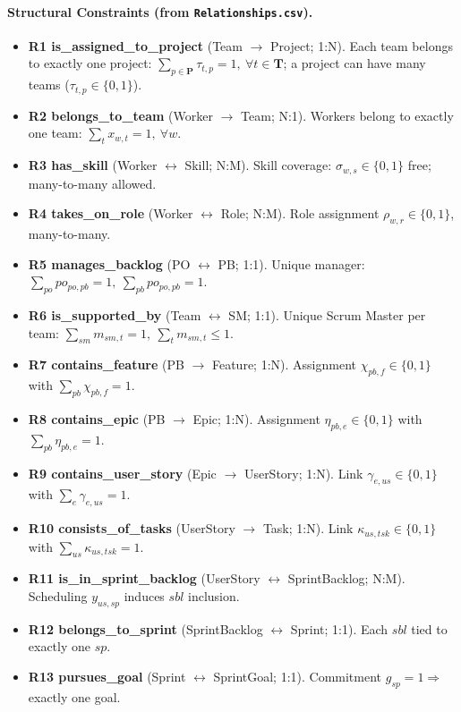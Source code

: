 \documentclass[11pt,a4paper]{article}
\begin{document}
\paragraph{Structural Constraints (from \texttt{Relationships.csv}).}
\begin{itemize}[leftmargin=2em,itemsep=0.6em]
  \item \textbf{R1 is\_assigned\_to\_project} (Team $\to$ Project; 1:N). Each team belongs to exactly one project: 
  $\sum_{p \in \mathbf{P}} \tau_{t,p}=1,\ \forall t\in\mathbf{T}$; a project can have many teams ($\tau_{t,p}\in\{0,1\}$).
  \item \textbf{R2 belongs\_to\_team} (Worker $\to$ Team; N:1). Workers belong to exactly one team: $\sum_{t} x_{w,t}=1,\ \forall w$.
  \item \textbf{R3 has\_skill} (Worker $\leftrightarrow$ Skill; N:M). Skill coverage: $\sigma_{w,s}\in\{0,1\}$ free; many-to-many allowed.
  \item \textbf{R4 takes\_on\_role} (Worker $\leftrightarrow$ Role; N:M). Role assignment $\rho_{w,r}\in\{0,1\}$, many-to-many.
  \item \textbf{R5 manages\_backlog} (PO $\leftrightarrow$ PB; 1:1). Unique manager: $\sum_{po} po_{po,pb}=1,\ \sum_{pb} po_{po,pb}=1$.
  \item \textbf{R6 is\_supported\_by} (Team $\leftrightarrow$ SM; 1:1). Unique Scrum Master per team: $\sum_{sm} m_{sm,t}=1,\ \sum_{t} m_{sm,t}\le 1$.
  \item \textbf{R7 contains\_feature} (PB $\to$ Feature; 1:N). Assignment $\chi_{pb,f}\in\{0,1\}$ with $\sum_{pb}\chi_{pb,f}=1$.
  \item \textbf{R8 contains\_epic} (PB $\to$ Epic; 1:N). Assignment $\eta_{pb,e}\in\{0,1\}$ with $\sum_{pb}\eta_{pb,e}=1$.
  \item \textbf{R9 contains\_user\_story} (Epic $\to$ UserStory; 1:N). Link $\gamma_{e,us}\in\{0,1\}$ with $\sum_{e}\gamma_{e,us}=1$.
  \item \textbf{R10 consists\_of\_tasks} (UserStory $\to$ Task; 1:N). Link $\kappa_{us,tsk}\in\{0,1\}$ with $\sum_{us}\kappa_{us,tsk}=1$.
  \item \textbf{R11 is\_in\_sprint\_backlog} (UserStory $\leftrightarrow$ SprintBacklog; N:M). Scheduling $y_{us,sp}$ induces $sbl$ inclusion.
  \item \textbf{R12 belongs\_to\_sprint} (SprintBacklog $\leftrightarrow$ Sprint; 1:1). Each $sbl$ tied to exactly one $sp$.
  \item \textbf{R13 pursues\_goal} (Sprint $\leftrightarrow$ SprintGoal; 1:1). Commitment $g_{sp}=1 \Rightarrow$ exactly one goal.

\end{itemize}
\end{document}
